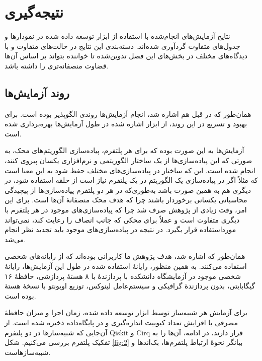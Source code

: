 \chapter{نتیجه‌گیری}
نتایج آزمایش‌های انجام‌شده با استفاده از ابزار توسعه داده شده در نمودارها و جدول‌های متفاوت گردآوری شده‌اند. دسته‌بندی این نتایج در حالت‌های متفاوت و با دیدگاه‌های مختلف در بخش‌های این فصل تدوین‌شده تا خواننده بتواند بر اساس آن‌ها قضاوت منصفانه‌تری را داشته باشد.

\section{روند آزمایش‌ها}
همان‌طور که در قبل هم اشاره شد، انجام آزمایش‌ها روندی الگوپذیر بوده است. برای بهبود و تسریع در این روند، از ابزار اشاره شده در طول آزمایش‌ها بهره‌برداری شده است.

آزمایش‌ها به این صورت بوده که برای هر پلتفرم، پیاده‌سازی الگوریتم‌های محک، به صورتی که این پیاده‌سازی‌ها از یک ساختار الگوریتمی و نرم‌افزاری یکسان پیروی کنند، انجام شده است. این که ساختار در پیاده‌سازی‌های مختلف حفظ شود به این معنا است که مثلاً اگر در پیاده‌سازی یک الگوریتم در یک پلتفرم نیاز است از حلقه استفاده شود، در دیگری هم به همین صورت باشد به‌طوری‌که در هر دو پلتفرم پیاده‌سازی‌ها از پیچیدگی محاسباتی یکسانی برخوردار باشند چرا که هدف محک منصفانهٔ آن‌ها است. برای این امر، وقت زیادی از پژوهش صرف شد چرا که پیاده‌سازی‌های موجود در هر پلتفرم با دیگری متفاوت است و عملاً برای محکی که جانب انصاف را رعایت کند، نمی‌تواند مورداستفاده قرار بگیرد. در نتیجه در پیاده‌سازی‌های موجود باید تجدید نظر انجام می‌شد.

همان‌طور که اشاره شد، هدف  پژوهش ما کاربرانی بوده‌اند که از رایانه‌های شخصی استفاده می‌کنند. به همین منظور، رایانهٔ استفاده شده در طول این آزمایش‌ها، رایانهٔ شخصی موجود در آزمایشگاه دانشکده با پردازندهٔ 
با ۸ هستهٔ پردازشی، حافظهٔ ۱۶ گیگابایتی، بدون پردازندهٔ گرافیکی و سیستم‌عامل لینوکس، توزیع اوبونتو با نسخهٔ هستهٔ
بوده است.


برای آزمایش هر شبیه‌ساز توسط ابزار توسعه داده شده، زمان اجرا و میزان حافظهٔ مصرفی با افزایش تعداد کیوبیت اندازه‌گیری و در پایگاه‌داده ذخیره شده است. از آن‌جایی که شبیه‌سازها در دو پلتفرم Qiskit و Cirq قرار دارند، در ادامه، آن‌ها را به تفکیک پلتفرم بررسی می‌کنیم. شکل \ref{fig:2} بیانگر نحوهٔ ارتباط پلتفرم‌ها، بک‌اندها و شبیه‌سازهاست.
 
